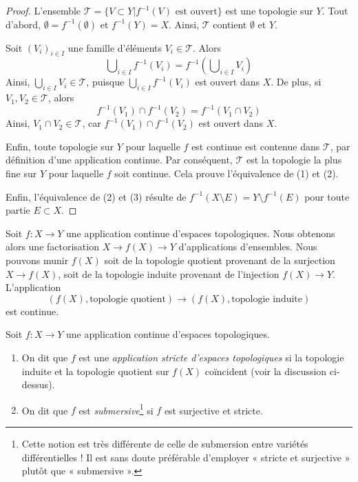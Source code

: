 \begin{proof}
L'ensemble $\mathcal{T} = \{V\subset Y | f^{-1}(V) \text{ est ouvert}\}$ est
une topologie sur $Y$. Tout d'abord,
$\emptyset = f^{-1}(\emptyset)$ et $f^{-1}(Y) = X$.
Ainsi, $\mathcal{T}$ contient $\emptyset$ et $Y$.

\medskip\noindent
Soit $(V_i)_{i \in I}$ une famille d'éléments $V_i \in \mathcal{T}$. Alors
$$
\bigcup\nolimits_{i\in I} f^{-1}(V_i) =
f^{-1}\left(\bigcup\nolimits_{i\in I} V_i\right)
$$
Ainsi, $\bigcup_{i\in I} V_i \in \mathcal{T}$, puisque
$\bigcup_{i\in I}f^{-1}(V_i)$ est ouvert dans $X$.
De plus, si $V_1, V_2 \in \mathcal{T}$, alors
$$
f^{-1}(V_1) \cap f^{-1}(V_2) = f^{-1}(V_1 \cap V_2)
$$
Ainsi, $V_1 \cap V_2 \in \mathcal{T}$, car
$f^{-1}(V_1) \cap f^{-1}(V_2)$ est ouvert dans $X$.

\medskip\noindent
Enfin, toute topologie sur $Y$ pour laquelle $f$ est continue est contenue
dans $\mathcal{T}$, par définition d'une application continue. Par conséquent,
$\mathcal{T}$ est la topologie la plus fine sur $Y$ pour laquelle $f$ soit
continue. Cela prouve l'équivalence de (1) et (2).

\medskip\noindent
Enfin, l'équivalence de (2) et (3) résulte de
$f^{-1}(X\setminus E) = Y \setminus f^{-1}(E)$ pour toute partie
$E \subset X$.
\end{proof}

\noindent
Soit $f : X \to Y$ une application continue d'espaces topologiques.
Nous obtenons alors une factorisation $X \to f(X) \to Y$ d'applications
d'ensembles. Nous pouvons munir $f(X)$ soit de la topologie quotient provenant
de la surjection $X \to f(X)$, soit de la topologie induite provenant de
l'injection $f(X) \to Y$. L'application
$$
(f(X), \text{topologie quotient})
\longrightarrow
(f(X), \text{topologie induite})
$$
est continue.

\begin{definition}
\label{definition-submersive}
Soit $f : X \to Y$ une application continue d'espaces topologiques.
\begin{enumerate}
\item On dit que $f$ est une {\it application stricte d'espaces topologiques}
si la topologie induite et la topologie quotient sur $f(X)$ coïncident
(voir la discussion ci-dessus).
\item On dit que $f$ est {\it submersive}\footnote{Cette notion est très
différente de celle de submersion entre variétés différentielles ! Il est sans
doute préférable d'employer « stricte et surjective » plutôt que
« submersive ».} si $f$ est surjective et stricte.
\end{enumerate}
\end{definition}

